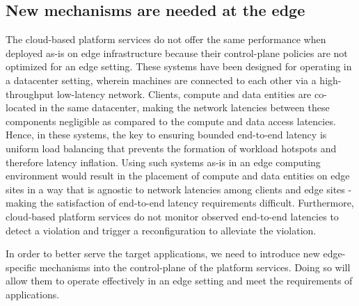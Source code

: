 \subsection{New mechanisms are needed at the edge}
The cloud-based platform services do not offer the same performance when deployed as-is on edge infrastructure because their control-plane policies are not optimized for an edge setting. These systems have been designed for operating in a datacenter setting, wherein machines are connected to each other via a high-throughput low-latency network. Clients, compute and data entities are co-located in the same datacenter, making the network latencies between these components negligible as compared to the compute and data access latencies. Hence, in these systems, the key to ensuring bounded end-to-end latency is uniform load balancing that prevents the formation of workload hotspots and therefore latency inflation. Using such systems as-is in an edge computing environment would result in the placement of compute and data entities on edge sites in a way that is agnostic to network latencies among clients and edge sites - making the satisfaction of end-to-end latency requirements difficult. Furthermore, cloud-based platform services do not monitor observed end-to-end latencies to detect a violation and trigger a reconfiguration to alleviate the violation.
\par In order to better serve the target applications, we need to introduce new edge-specific mechanisms into the control-plane of the platform services. Doing so will allow them to operate effectively in an edge setting and meet the requirements of applications.